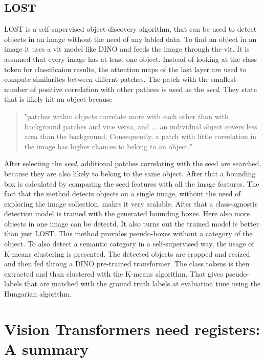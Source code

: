 \documentclass[conference]{IEEEtran}
\begin{document}
  \subsection{LOST}
  \label{chapter:lost}

  \mbox{LOST} is a self-supervised object discovery algorithm, that can be used to detect objects in an image without the need of any labled data. To find an object in an image it uses a \ac{vit} model like \mbox{DINO} and feeds the image through the \ac{vit}. It is assumed that every image has at least one object. Instead of looking at the class token for classificaion results, the attention maps of the last layer are used to compute similarites between differnt patches. The patch with the smallest number of positive correlation with other pathces is used as the \textit{seed}. They state that is likely hit an object because
  \begin{quote}
    "patches within objects correlate more with each other than with background patches and vice versa, and ... an individual object covers less area than the background. Consequently, a patch with little correlation in the image has higher chances to belong to an object." \cite{lost}
  \end{quote}
  After selecting the \textit{seed}, additional patches correlating with the seed are searched, because they are also likely to belong to the same object. After that a bounding box is calculated by comparing the seed features with all the image features. The fact that the method detects objects on a single image, without the need of exploring the image collection, makes it very scalable. After that a class-agnostic detection model is trained with the generated bounding boxes. Here also more objects in one image can be detectd. It also turns out the trained model is better than just \mbox{LOST}. This method provides pseudo-boxes without a category of the object. To also detect a semantic category in a self-supervised way, the usage of K-means clustering is presented. The detected objects are cropped and resized and then fed throug a \mbox{DINO} pre-trained transformer. The class tokens is then extracted and than clustered with the K-means algorithm. That gives pseudo-labels that are matched with the ground truth labels at evaluation time using the Hungarian algorithm. \cite{lost}



  \section{Vision Transformers need registers: A summary}
  \label{sec:registers}
\end{document}

